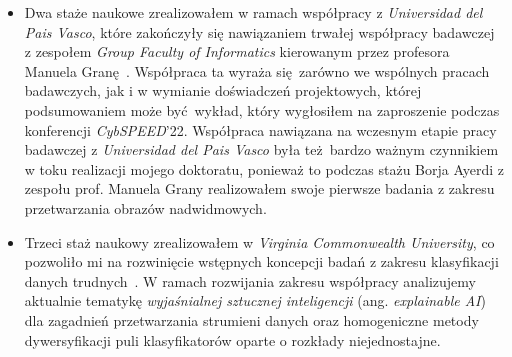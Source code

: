 \begin{itemize}
	\item Dwa staże naukowe zrealizowałem w ramach współpracy z \emph{Universidad del Pais Vasco}, które zakończyły się nawiązaniem trwałej współpracy badawczej z zespołem \emph{Group Faculty of Informatics} kierowanym przez profesora Manuela Granę~. Współpraca ta wyraża się zarówno we wspólnych pracach badawczych, jak i w wymianie doświadczeń projektowych, której podsumowaniem może być wykład, który wygłosiłem na zaproszenie podczas konferencji \emph{CybSPEED}'22. Współpraca nawiązana na wczesnym etapie pracy badawczej z \emph{Universidad del Pais Vasco} była też bardzo ważnym czynnikiem w toku realizacji mojego doktoratu, ponieważ to podczas stażu Borja Ayerdi z zespołu prof. Manuela Grany realizowałem swoje pierwsze badania z zakresu przetwarzania obrazów nadwidmowych. 
	
	\item Trzeci staż naukowy zrealizowałem w \emph{Virginia Commonwealth University}, co pozwoliło mi na rozwinięcie wstępnych koncepcji badań z zakresu klasyfikacji danych trudnych~. W ramach rozwijania zakresu współpracy analizujemy aktualnie tematykę \emph{wyjaśnialnej sztucznej inteligencji} (ang. \emph{explainable AI}) dla zagadnień przetwarzania strumieni danych oraz homogeniczne metody dywersyfikacji puli klasyfikatorów oparte o rozkłady niejednostajne.

\end{itemize}
 